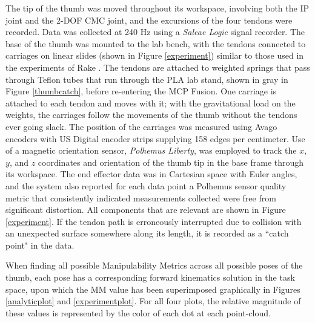 \documentclass[journal]{IEEEtran}
\begin{document}
The tip of the thumb was moved throughout its workspace, involving both the IP joint and the 2-DOF CMC joint, and the excursions of the four tendons were recorded. Data was collected at 240 Hz using a {\it Saleae Logic} signal recorder. The base of the thumb was mounted to the lab bench, with the tendons connected to carriages on linear slides (shown in Figure \ref{experiment}) similar to those used in the experiments of Rake \cite{rake2}. The tendons are attached to weighted springs that pass through Teflon tubes that run through the PLA lab stand, shown in gray in Figure \ref{thumbcatch}, before re-entering the MCP Fusion. One carriage is attached to each tendon and moves with it; with the gravitational load on the weights, the carriages follow the movements of the thumb without the tendons ever going slack. The position of the carriages was measured using Avago encoders with US Digital encoder strips supplying 158 edges per centimeter. Use of a magnetic orientation sensor, {\it Polhemus Liberty}, was employed to track the $x$, $y$, and $z$ coordinates and orientation of the thumb tip in the base frame through its workspace. The end effector data was in Cartesian space with Euler angles, and the system also reported for each data point a Polhemus sensor quality metric that consistently indicated measurements collected were free from significant distortion. All components that are relevant are shown in Figure \ref{experiment}. If the tendon path is erroneously interrupted due to collision with an unexpected surface somewhere along its length, it is recorded as a ``catch point" in the data.

When finding all possible Manipulability Metrics across all possible poses of the thumb, each pose has a corresponding forward kinematics solution in the task space, upon which the MM value has been superimposed graphically in Figures \ref{analyticplot} and \ref{experimentplot}. For all four plots, the relative magnitude of these values is represented by the color of each dot at each point-cloud.
\end{document}
